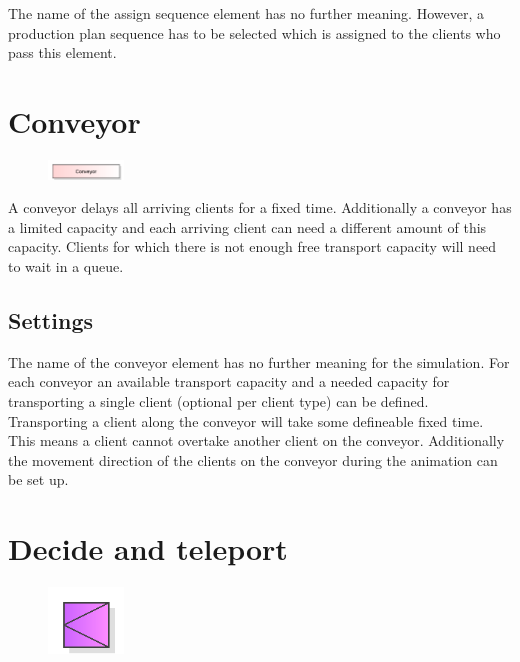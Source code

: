 The name of the assign sequence element has no further meaning. However, a production plan sequence
has to be selected which is assigned to the clients who pass this element.


\section{Conveyor}
\label{ref:ModelElementConveyor}

\begin{figure}
\vspace{-22pt}
\includegraphics[width=2cm]{imageModelElementConveyor.png}
\vspace{-22pt}
\end{figure}

A conveyor delays all arriving clients for a fixed time.
Additionally a conveyor has a limited capacity and each
arriving client can need a different amount of this capacity.
Clients for which there is not enough free transport capacity
will need to wait in a queue.

\subsection*{Settings}

The name of the conveyor element has no further meaning for the simulation.
For each conveyor an available transport capacity and a needed capacity for
transporting a single client (optional per client type) can be defined.
Transporting a client along the conveyor will take some defineable fixed
time. This means a client cannot overtake another client on the conveyor.
Additionally the movement direction of the clients on the conveyor during
the animation can be set up.


\section{Decide and teleport}
\label{ref:ModelElementDecideAndTeleport}

\begin{figure}
\vspace{-22pt}
\includegraphics[width=2cm]{imageModelElementDecideAndTeleport.png}
\vspace{-22pt}
\end{figure}

